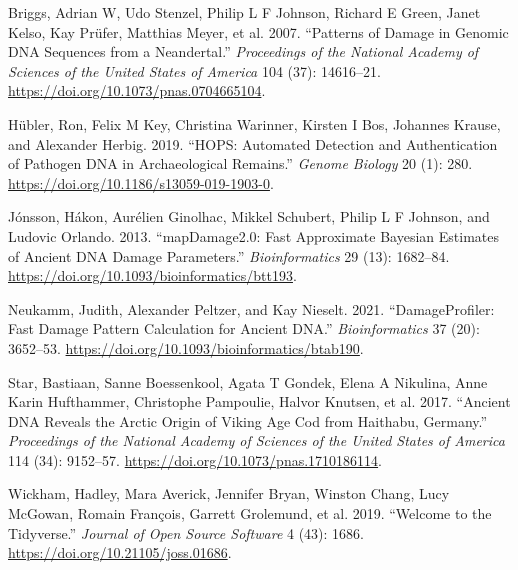 \documentclass[
  letterpaper,
  DIV=11,
  numbers=noendperiod]{scrreprt}
\newlength{\cslhangindent}
\newlength{\cslentryspacingunit} %
\newenvironment{CSLReferences}[2] %
 {%
  \setlength{\parindent}{0pt}
  \ifodd #1
  \let\oldpar\par
  \def\par{\hangindent=\cslhangindent\oldpar}
  \fi
  \setlength{\parskip}{#2\cslentryspacingunit}
 }%
 {}
\begin{document}
\hypertarget{refs}{}
\begin{CSLReferences}{1}{0}
\leavevmode{}%
Briggs, Adrian W, Udo Stenzel, Philip L F Johnson, Richard E Green,
Janet Kelso, Kay Prüfer, Matthias Meyer, et al. 2007. {``Patterns of
Damage in Genomic {DNA} Sequences from a Neandertal.''}
\emph{Proceedings of the National Academy of Sciences of the United
States of America} 104 (37): 14616--21.
\url{https://doi.org/10.1073/pnas.0704665104}.

\leavevmode{}%
Hübler, Ron, Felix M Key, Christina Warinner, Kirsten I Bos, Johannes
Krause, and Alexander Herbig. 2019. {``{HOPS}: Automated Detection and
Authentication of Pathogen {DNA} in Archaeological Remains.''}
\emph{Genome Biology} 20 (1): 280.
\url{https://doi.org/10.1186/s13059-019-1903-0}.

\leavevmode{}%
Jónsson, Hákon, Aurélien Ginolhac, Mikkel Schubert, Philip L F Johnson,
and Ludovic Orlando. 2013. {``{mapDamage2}.0: Fast Approximate Bayesian
Estimates of Ancient {DNA} Damage Parameters.''} \emph{Bioinformatics}
29 (13): 1682--84. \url{https://doi.org/10.1093/bioinformatics/btt193}.

\leavevmode{}%
Neukamm, Judith, Alexander Peltzer, and Kay Nieselt. 2021.
{``{DamageProfiler}: Fast Damage Pattern Calculation for Ancient
{DNA}.''} \emph{Bioinformatics} 37 (20): 3652--53.
\url{https://doi.org/10.1093/bioinformatics/btab190}.

\leavevmode{}%
Star, Bastiaan, Sanne Boessenkool, Agata T Gondek, Elena A Nikulina,
Anne Karin Hufthammer, Christophe Pampoulie, Halvor Knutsen, et al.
2017. {``Ancient {DNA} Reveals the Arctic Origin of Viking Age Cod from
Haithabu, Germany.''} \emph{Proceedings of the National Academy of
Sciences of the United States of America} 114 (34): 9152--57.
\url{https://doi.org/10.1073/pnas.1710186114}.

\leavevmode{}%
Wickham, Hadley, Mara Averick, Jennifer Bryan, Winston Chang, Lucy
McGowan, Romain François, Garrett Grolemund, et al. 2019. {``Welcome to
the Tidyverse.''} \emph{Journal of Open Source Software} 4 (43): 1686.
\url{https://doi.org/10.21105/joss.01686}.

\end{CSLReferences}
\end{document}
